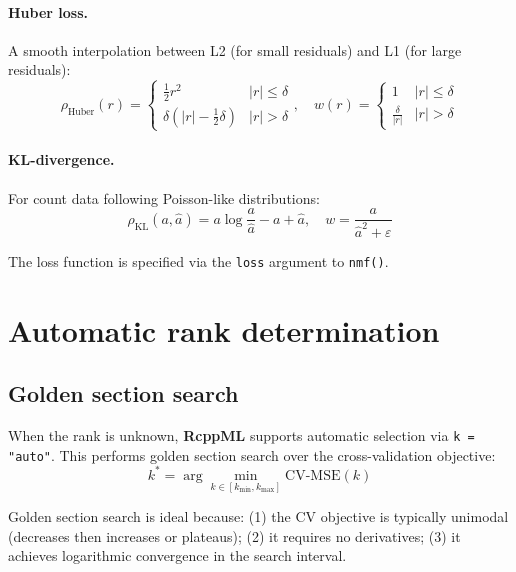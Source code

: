 \documentclass[11pt]{article}
\newcommand{\pkg}[1]{\textbf{#1}}
\newcommand{\code}[1]{\texttt{#1}}
\newcommand{\fct}[1]{\code{#1()}}
\begin{document}
\paragraph{Huber loss.}
A smooth interpolation between L2 (for small residuals) and L1 (for large 
residuals):
\begin{equation}
  \rho_{\text{Huber}}(r) = \begin{cases}
    \frac{1}{2}r^2 & |r| \leq \delta \\
    \delta(|r| - \frac{1}{2}\delta) & |r| > \delta
  \end{cases}, \quad
  w(r) = \begin{cases}
    1 & |r| \leq \delta \\
    \frac{\delta}{|r|} & |r| > \delta
  \end{cases}
  \label{eq:huber}
\end{equation}

\paragraph{KL-divergence.}
For count data following Poisson-like distributions:
\begin{equation}
  \rho_{\text{KL}}(a, \hat{a}) = a \log\frac{a}{\hat{a}} - a + \hat{a}, \quad
  w = \frac{a}{\hat{a}^2 + \varepsilon}
  \label{eq:kl}
\end{equation}

The loss function is specified via the \code{loss} argument to \fct{nmf}.


\section{Automatic rank determination} \label{sec:automatic}

\subsection{Golden section search}

When the rank is unknown, \pkg{RcppML} supports automatic selection via 
\code{k = "auto"}. This performs golden section search \citep{Kiefer1953} over 
the cross-validation objective:
\begin{equation}
  k^* = \arg\min_{k \in [k_{\min}, k_{\max}]} \text{CV-MSE}(k)
  \label{eq:auto_k}
\end{equation}

Golden section search is ideal because: (1) the CV objective is typically 
unimodal (decreases then increases or plateaus); (2) it requires no derivatives; 
(3) it achieves logarithmic convergence in the search interval.
\end{document}
